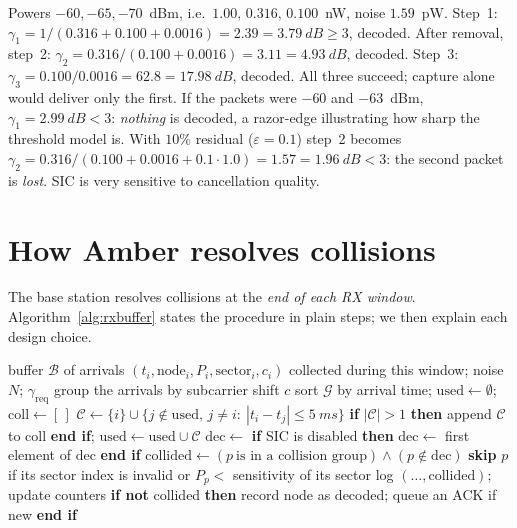 \begin{example}
Powers $-60,-65,-70$~dBm, i.e.\ $1.00,\,0.316,\,0.100$~nW, noise $1.59$~pW. Step~1: $\gamma_1=1/(0.316+0.100+0.0016)=2.39=\SI{3.79}{dB}\ge3$, decoded.
After removal, step~2: $\gamma_2=0.316/(0.100+0.0016)=3.11=\SI{4.93}{dB}$, decoded. Step~3: $\gamma_3=0.100/0.0016=62.8=\SI{17.98}{dB}$, decoded. All three succeed;
capture alone would deliver only the first. If the packets were $-60$ and $-63$~dBm, $\gamma_1=\SI{2.99}{dB}<3$: \emph{nothing} is decoded, a razor-edge illustrating how sharp the threshold model is.
With $10\%$ residual ($\varepsilon=0.1$) step~2 becomes $\gamma_2=0.316/(0.100+0.0016+0.1\cdot1.0)=1.57=\SI{1.96}{dB}<3$: the second packet is \emph{lost}. SIC is very sensitive to cancellation quality.
\end{example}

\section{How Amber resolves collisions}
\label{sec:ambercollisions}

The base station resolves collisions at the \emph{end of each RX window}. Algorithm~\ref{alg:rxbuffer} states the procedure in plain steps; we then explain each design choice.

\begin{algorithm}[t]
\caption{Processing of one RX window ()}
\label{alg:rxbuffer}
\begin{algorithmic}[1]
\Require buffer $\mathcal B$ of arrivals $(t_i,\mathrm{node}_i,P_i,\mathrm{sector}_i,c_i)$ collected during this window; noise $N$; $\gamma_{\mathrm{req}}$
\State group the arrivals by subcarrier shift $c$
  \State sort $\mathcal G$ by arrival time; $\mathrm{used}\gets\emptyset$; $\mathrm{coll}\gets[\,]$
     \State $\mathcal C\gets\{i\}\cup\{j\notin\mathrm{used},\,j\ne i:\ |t_i-t_j|\le\SI{5}{ms}\}$
     \State \textbf{if} $|\mathcal C|>1$ \textbf{then} append $\mathcal C$ to $\mathrm{coll}$ \textbf{end if}; \quad $\mathrm{used}\gets\mathrm{used}\cup\mathcal C$
  \EndFor
     \State $\mathrm{dec}\gets$ 
     \State \textbf{if} SIC is disabled \textbf{then} $\mathrm{dec}\gets$ first element of $\mathrm{dec}$ \textbf{end if} 
  \EndFor
     \State $\mathrm{collided}\gets(p\ \text{is in a collision group})\wedge(p\notin\mathrm{dec})$
     \State \textbf{skip} $p$ if its sector index is invalid or $P_p<$ sensitivity of its sector
     \State log $(\dots,\mathrm{collided})$; update counters
     \State \textbf{if not} collided \textbf{then} record node as decoded; queue an ACK if new \textbf{end if}
  \EndFor
\EndFor
\end{algorithmic}
\end{algorithm}

